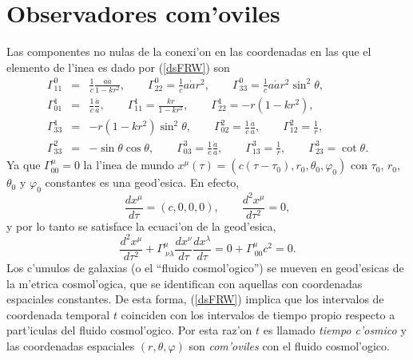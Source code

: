 \section{Observadores com'oviles}
Las componentes no nulas de la conexi'on en las coordenadas en las que el elemento de l'inea es dado por (\ref{dsFRW}) son
\begin{eqnarray} 
 \Gamma^0_{11}&=&\frac{1}{c}\frac{a\dot{a}}{1-kr^2}, \qquad \Gamma^0_{22}=\frac{1}{c}a\dot{a}r^{2}, \qquad 
\Gamma^0_{33}=\frac{1}{c}a\dot{a}r^2\sin^2\theta ,\\
\Gamma^1_{01}&=&\frac{1}{c}\frac{\dot{a}}{a}, \qquad \Gamma^1_{11}=\frac{kr}{1-kr^2}, \qquad
\Gamma^1_{22}=-r(1-kr^2),\\
 \Gamma^1_{33}&=&-r(1-kr^2)\sin^2\theta, \qquad \Gamma^2_{02}=\frac{1}{c}\frac{\dot{a}}{a}, \qquad
\Gamma^2_{12}=\frac{1}{r}, \\
\Gamma^2_{33}&=&-\sin\theta\cos\theta, \qquad \Gamma^3_{03}=\frac{1}{c}\frac{\dot{a}}{a}, \qquad
\Gamma^3_{13}=\frac{1}{r}, \qquad
\Gamma^3_{23}=\cot\theta .
\end{eqnarray}
Ya que $\Gamma^\mu_{00}=0$ la l'inea de mundo $x^\mu(\tau)=(c(\tau-\tau_0),r_0,\theta_0,\varphi_0)$ con $\tau_0$, $r_0$, $\theta_0$ y $\varphi_0$ constantes es una geod'esica. En efecto,
\begin{equation}
\frac{dx^\mu}{d\tau}=(c,0,0,0), \qquad   \frac{d^2x^\mu}{d\tau^2}=0,
\end{equation}
y por lo tanto se satisface la ecuaci'on de la geod'esica,
\begin{equation}
 \frac{d^2x^\mu}{d\tau^2}+\Gamma^\mu_{\ \nu\lambda}\frac{dx^\nu}{d\tau}\frac{dx^\lambda}{d\tau}=0+\Gamma^\mu_{\ 00}c^2=0.
\end{equation}
Los c'umulos de galaxias (o el ``fluido cosmol'ogico'') se mueven en geod'esicas de la m'etrica cosmol'ogica,
que se identifican con aquellas con coordenadas espaciales constantes. De esta forma, (\ref{dsFRW}) implica que los
intervalos de coordenada temporal $t$ coinciden con los intervalos de tiempo propio respecto a part'iculas del fluido
cosmol'ogico. Por esta raz'on $t$ es llamado \textit{tiempo c'osmico} y las coordenadas espaciales $(r,\theta,\varphi)$
son \textit{com'oviles} con el fluido cosmol'ogico.
